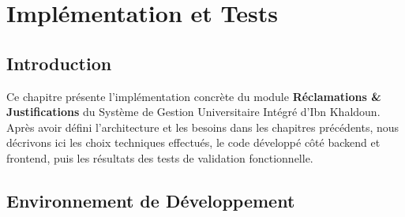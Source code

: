 
%

\chapter{Implémentation et Tests}

\section{Introduction}

Ce chapitre présente l'implémentation concrète du module
\textbf{Réclamations \& Justifications} du Système de Gestion Universitaire
Intégré d'Ibn Khaldoun. Après avoir défini l'architecture et les besoins dans
les chapitres précédents, nous décrivons ici les choix techniques effectués,
le code développé côté backend et frontend, puis les résultats des tests de
validation fonctionnelle.

\section{Environnement de Développement}

